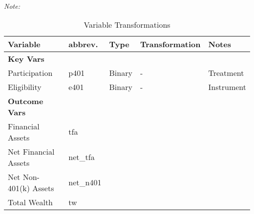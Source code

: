\documentclass[12pt,a4paper]{article}
\begin{document}
\begin{landscape}
\begin{singlespace}
			\def\sym#1{\ifmmode^{#1}\else\(^{#1}\)\fi}
			\begin{ThreePartTable}
				\begin{TableNotes}
					\begin{scriptsize}
					\item \textit{Note:} 		
					\end{scriptsize}
				\end{TableNotes}
				
				\begin{longtable}{l C{2cm} C{4cm} C{6cm} C{6cm} }
					\caption{Variable Transformations}\label{tab_soep_transmission_all_controls}\\
					Variable & abbrev. & Type & Transformation & Notes   \\
					\midrule
					\textbf{Key Vars} & & & & \\
					Participation & p401 & Binary & - & Treatment \\
					Eligibility & e401 & Binary & - & Instrument \\
					\midrule
					\textbf{Outcome Vars} & & & & \\
					Financial Assets & tfa & & &	\\
					Net Financial Assets & net_tfa & & &	\\
					Net Non-401(k) Assets & net_n401 & & & \\
					Total Wealth & tw & & & \\


\end{longtable}
\end{ThreePartTable}
\end{singlespace}
\end{landscape}
\end{document}
